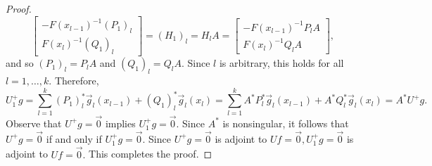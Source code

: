 \documentclass[11pt,reqno,oneside,a4paper]{article}
\theoremstyle{plain} %
\theoremstyle{definition}
\theoremstyle{remark}
\begin{document}
\begin{proof}
\[ 
\begin{bmatrix}
-F(x_{l-1})^{-1} (P_1)_l \\
F(x_l)^{-1}(Q_1)_l
\end{bmatrix}  = (H_1)_l = H_l A = \begin{bmatrix}
-F(x_{l-1})^{-1} P_l A\\
F(x_l)^{-1}Q_l A
\end{bmatrix},
\]
and so $(P_1)_l  = P_l A$ and $(Q_1)_l= Q_l A.$ Since $l$ is arbitrary, this holds for all $l = 1,\ldots, k.$ Therefore,
\[ U_1^+ g = \sum^k_{l=1} (P_1)^*_l \vec{g}_l(x_{l-1}) + (Q_1)^*_l \vec{g}_l(x_l) =  \sum^k_{l=1} A^*P_l^* \vec{g}_l(x_{l-1}) + A^*Q_l^*  \vec{g}_l(x_l) = A^*U^+ g.\]
Observe that $U^+ g = \vec{0}$ implies $U_1^+ g = \vec{0}.$ Since $A^*$ is nonsingular, it follows that $U^+ g = \vec{0}$ if and only if $U_1^+ g = \vec{0}.$ Since $U^+ g= \vec{0}$ is adjoint to $Uf= \vec{0}, U^+_1 g= \vec{0}$ is adjoint to $Uf= \vec{0}.$ This completes the proof. 
\end{proof}



\end{document}
